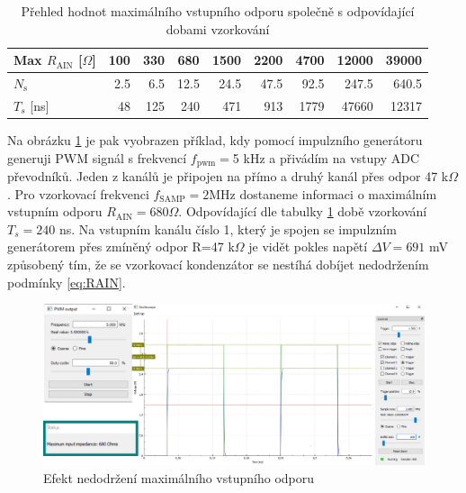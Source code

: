 \begin{table}[H]
	\begin{tabular}{lrrrrrrrr}
		Max $R_{\text{AIN}}$ [$\Omega$]       & \multicolumn{1}{c}{100} & \multicolumn{1}{c}{330} & \multicolumn{1}{c}{680} & \multicolumn{1}{c}{1500} & \multicolumn{1}{c}{2200} & \multicolumn{1}{c}{4700} & \multicolumn{1}{c}{12000} & \multicolumn{1}{c}{39000} \\ \hline
		$N_{\text{s}}$ & 2.5                     & 6.5                     & 12.5                    & 24.5                     & 47.5                     & 92.5                     & 247.5                     & 640.5                     \\
		$T_s$ {[}ns{]}    & 48                      & 125                     & 240                     & 471                      & 913                      & 1779                     & 47660                     & 12317                    
	\end{tabular}
	\caption{Přehled hodnot maximálního vstupního odporu společně s odpovídající dobami vzorkování}
	\label{tab:maxRAIN}
\end{table}

 Na obrázku \ref{fig:wrongmaxrain} je pak vyobrazen příklad, kdy pomocí impulzního generátoru generuji PWM signál s frekvencí $f_{\text{pwm}}=$5 kHz a přivádím na vstupy ADC převodníků. Jeden z kanálů je připojen na přímo a druhý kanál přes odpor 47 k$\Omega$. Pro vzorkovací frekvenci $f_{\text{SAMP}}=2$MHz dostaneme informaci o maximálním vstupním odporu $R_{\text{AIN}}=680\Omega$. Odpovídající dle tabulky \ref{tab:maxRAIN} době vzorkování $T_s=240$ ns. Na vstupním kanálu číslo 1, který je spojen se impulzním generátorem přes zmíněný odpor R=47 k$\Omega$ je vidět pokles napětí $\Delta V=691$ mV způsobený tím, že se vzorkovací kondenzátor se nestíhá dobíjet nedodržením podmínky \ref{eq:RAIN}.


\begin{figure}[H]
	\centering
	\includegraphics[width=0.9\linewidth]{Figs/Screenshots/RAINpwmgraph.pdf}
	\caption{Efekt nedodržení maximálního vstupního odporu}
	\label{fig:wrongmaxrain}
\end{figure}

